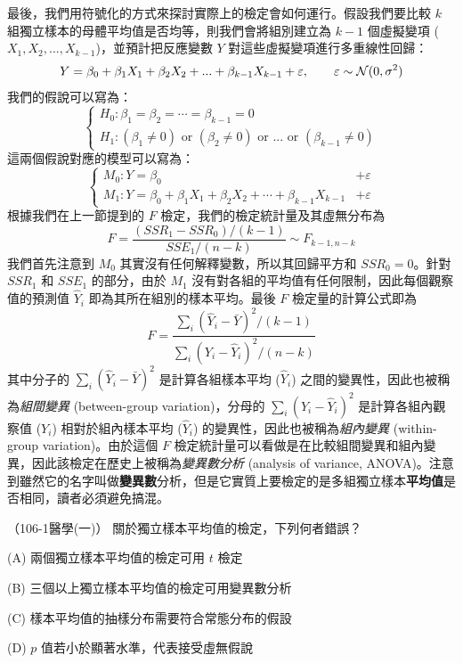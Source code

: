     最後，我們用符號化的方式來探討實際上的檢定會如何運行。假設我們要比較 $k$ 組獨立樣本的母體平均值是否均等，則我們會將組別建立為 $k-1$ 個虛擬變項 ($X_1, X_2,...,X_{k-1}$)，並預計把反應變數 $Y$ 對這些虛擬變項進行多重線性回歸：
    \[Y = \beta_0 + \beta_1 X_1 + \beta_2 X_2 + ... + \beta_{k-1} X_{k-1} + \varepsilon, \qquad \varepsilon \sim \mathcal{N}(0, \sigma^2)\]
    我們的假說可以寫為：
    \[\left\{\begin{array}{l}
        H_0: \beta_1 = \beta_2 = \cdots = \beta_{k-1} = 0\\
        H_1: (\beta_1 \ne 0) \text{ or } (\beta_2 \ne 0) \text{ or } ... \text{ or } (\beta_{k-1} \ne 0)
    \end{array}\right.\]
    這兩個假說對應的模型可以寫為：
    \[\left\{\begin{array}{ll}
        M_0: Y = \beta_0  &+ \varepsilon\\
        M_1: Y = \beta_0 + \beta_1 X_1 + \beta_2 X_2 + \cdots  + \beta_{k-1} X_{k-1} &+ \varepsilon
    \end{array}\right.\]
    根據我們在上一節提到的 $F$ 檢定，我們的檢定統計量及其虛無分布為
    \[F = \frac{(SSR_1 - SSR_0)/(k-1)}{SSE_1/(n-k)} \sim F_{k-1, n-k}\]
    我們首先注意到 $M_0$ 其實沒有任何解釋變數，所以其回歸平方和 $SSR_0 = 0$。針對 $SSR_1$ 和 $SSE_1$ 的部分，由於 $M_1$ 沒有對各組的平均值有任何限制，因此每個觀察值的預測值 $\hat{Y}_i$ 即為其所在組別的樣本平均。最後 $F$ 檢定量的計算公式即為
    \[F = \frac{\sum_i (\hat{Y}_i-\bar{Y})^2/(k-1)}{\sum_i (Y_i-\hat{Y}_i)^2/(n-k)}\]
    其中分子的 $\sum_i (\hat{Y}_i-\bar{Y})^2$ 是計算各組樣本平均 ($\hat{Y}_i$) 之間的變異性，因此也被稱為\textit{組間變異} (between-group variation)，分母的 $\sum_i (Y_i-\hat{Y}_i)^2$ 是計算各組內觀察值 ($Y_i$) 相對於組內樣本平均 ($\hat{Y}_i$) 的變異性，因此也被稱為\textit{組內變異} (within-group variation)。由於這個 $F$ 檢定統計量可以看做是在比較組間變異和組內變異，因此該檢定在歷史上被稱為\textit{變異數分析} (analysis of variance, ANOVA)。注意到雖然它的名字叫做\textbf{變異數}分析，但是它實質上要檢定的是多組獨立樣本\textbf{平均值}是否相同，讀者必須避免搞混。
  
    \begin{docexam}{（106-1醫學(一)）}
        關於獨立樣本平均值的檢定，下列何者錯誤？

        (A) 兩個獨立樣本平均值的檢定可用 $t$ 檢定

        (B) 三個以上獨立樣本平均值的檢定可用變異數分析

        (C) 樣本平均值的抽樣分布需要符合常態分布的假設

        (D) $p$ 值若小於顯著水準，代表接受虛無假說
    \end{docexam}
    
